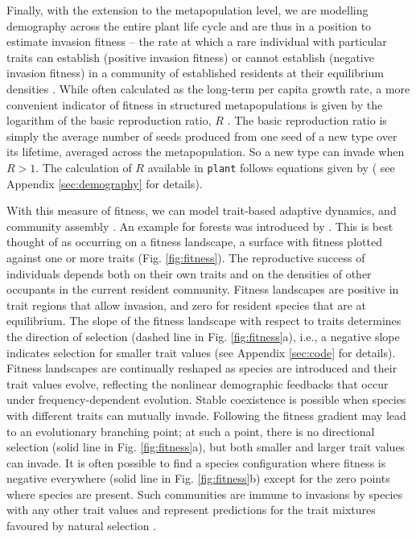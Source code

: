\documentclass[a4paper,11pt]{article}
\newcommand{\plant}{\texttt{plant}}
\begin{document}
Finally, with the extension to the metapopulation level, we are
modelling demography across the entire plant life cycle and are thus in a
position to estimate invasion fitness -- the rate at which a rare
individual with particular traits can establish (positive invasion fitness) or cannot establish (negative invasion fitness) in a community of
established residents at their equilibrium densities
\citep{Metz-1992}. While often calculated as the
long-term per capita growth rate, a more convenient indicator of
fitness in structured metapopulations is given by the
logarithm of the basic reproduction ratio, \(R\) \citep{Gyllenberg-2001, Metz-2001}. The basic reproduction ratio is simply the average number of seeds produced from one seed of a new type over its lifetime, averaged across the metapopulation. So a new type can
invade when \(R > 1\). The calculation of \(R\) available in
{\plant} follows equations given by \citet{Falster-2015} (
see Appendix \ref{sec:demography} for details).

With this measure of fitness, we can model trait-based adaptive
dynamics, and community assembly \citep{Metz-1992, Geritz-1998,
Chesson-2000, Dieckmann-2004, Brannstrom-2013b}. An example
for forests was introduced by
\citet{Falster-2015}. This is best thought of as occurring on a fitness landscape,
a surface with fitness plotted against one or more traits
(Fig. \ref{fig:fitness}). The reproductive success of individuals
depends both on their own traits and on the densities of other occupants in the current resident community. Fitness landscapes are positive in trait regions that allow invasion, and zero
for resident species that are at equilibrium. The slope of the fitness
landscape with respect to traits determines the direction of selection
(dashed line in Fig. \ref{fig:fitness}a), i.e., a negative slope indicates selection for
smaller trait values (see Appendix \ref{sec:code} for
details). Fitness landscapes are continually reshaped as species are
introduced and their trait values evolve, reflecting the nonlinear demographic feedbacks
that occur under frequency-dependent evolution. Stable coexistence is
possible when species with different traits can mutually invade.
Following the fitness gradient may lead to an
evolutionary branching point; at
such a point, there is no directional selection (solid line in
Fig. \ref{fig:fitness}a), but both smaller and larger trait values can invade.
It is often possible to find a species configuration where
fitness is negative everywhere (solid line in Fig. \ref{fig:fitness}b)
except for the zero points where species are present. Such communities
are immune to invasions by species with any other trait values and represent
predictions for the trait mixtures favoured by
natural selection .
\end{document}
